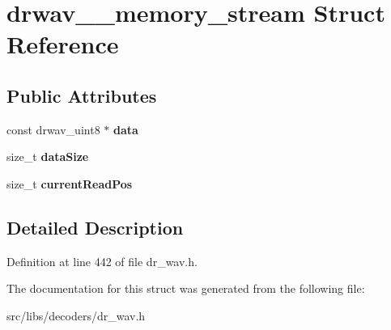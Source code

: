 \hypertarget{structdrwav____memory__stream}{\section{drwav\-\_\-\-\_\-memory\-\_\-stream Struct Reference}
\label{structdrwav____memory__stream}
}
\subsection*{Public Attributes}
\begin{DoxyCompactItemize}
\item 
\hypertarget{structdrwav____memory__stream_a284990f6414466a6d43794ed00a5057c}{const drwav\-\_\-uint8 $\ast$ {\bfseries data}}\label{structdrwav____memory__stream_a284990f6414466a6d43794ed00a5057c}

\item 
\hypertarget{structdrwav____memory__stream_ac9afa4dd398c46e0d690e41c79f1b984}{size\-\_\-t {\bfseries data\-Size}}\label{structdrwav____memory__stream_ac9afa4dd398c46e0d690e41c79f1b984}

\item 
\hypertarget{structdrwav____memory__stream_ade61b945505553e8ba4318dfeed2afbe}{size\-\_\-t {\bfseries current\-Read\-Pos}}\label{structdrwav____memory__stream_ade61b945505553e8ba4318dfeed2afbe}

\end{DoxyCompactItemize}


\subsection{Detailed Description}


Definition at line 442 of file dr\-\_\-wav.\-h.



The documentation for this struct was generated from the following file\-:\begin{DoxyCompactItemize}
\item 
src/libs/decoders/dr\-\_\-wav.\-h\end{DoxyCompactItemize}
